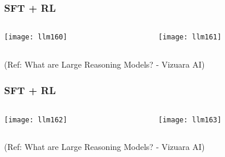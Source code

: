 \begin{frame}[fragile]\frametitle{SFT + RL}


\begin{columns}
    \begin{column}[T]{0.5\linewidth}
		\begin{center}
		\texttt{[image: llm160]}
		\end{center}

    \end{column}
    \begin{column}[T]{0.5\linewidth}
		\begin{center}
		\texttt{[image: llm161]}
		\end{center}
    \end{column}
  \end{columns}
  

{\tiny (Ref: What are Large Reasoning Models? - Vizuara AI)}

\end{frame}


\begin{frame}[fragile]\frametitle{SFT + RL}


\begin{columns}
    \begin{column}[T]{0.5\linewidth}
		\begin{center}
		\texttt{[image: llm162]}
		\end{center}

    \end{column}
    \begin{column}[T]{0.5\linewidth}
		\begin{center}
		\texttt{[image: llm163]}
		\end{center}
    \end{column}
  \end{columns}
  

{\tiny (Ref: What are Large Reasoning Models? - Vizuara AI)}

\end{frame}

